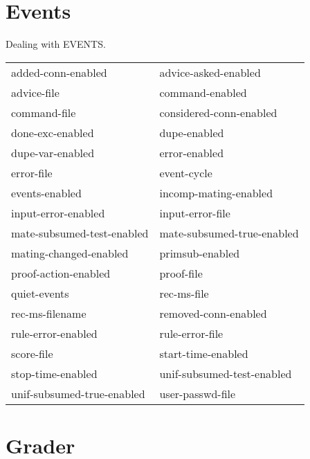 \section{Events}

\begin{description} 
\item[EVENTS]  
Dealing with EVENTS.

\begin{tabular}{l l}
added-conn-enabled&advice-asked-enabled\\
advice-file&command-enabled\\
command-file&considered-conn-enabled\\
done-exc-enabled&dupe-enabled\\
dupe-var-enabled&error-enabled\\
error-file&event-cycle\\
events-enabled&incomp-mating-enabled\\
input-error-enabled&input-error-file\\
mate-subsumed-test-enabled&mate-subsumed-true-enabled\\
mating-changed-enabled&primsub-enabled\\
proof-action-enabled&proof-file\\
quiet-events&rec-ms-file\\
rec-ms-filename&removed-conn-enabled\\
rule-error-enabled&rule-error-file\\
score-file&start-time-enabled\\
stop-time-enabled&unif-subsumed-test-enabled\\
unif-subsumed-true-enabled&user-passwd-file\\
\end{tabular}
\item
\end{description}

\section{Grader}

